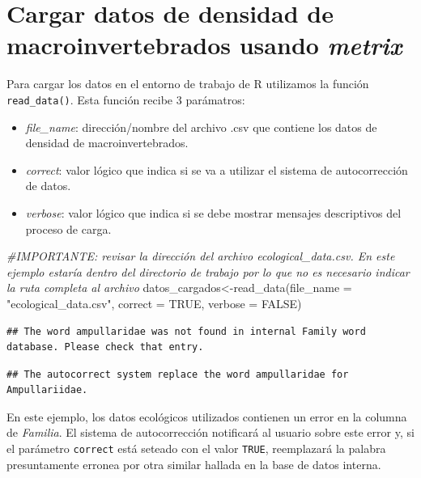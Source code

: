 \documentclass[
]{book}
\newenvironment{Shaded}{\begin{snugshade}}{\end{snugshade}}
\newcommand{\AttributeTok}[1]{\textcolor[rgb]{0.77,0.63,0.00}{#1}}
\newcommand{\CommentTok}[1]{\textcolor[rgb]{0.56,0.35,0.01}{\textit{#1}}}
\newcommand{\ConstantTok}[1]{\textcolor[rgb]{0.00,0.00,0.00}{#1}}
\newcommand{\FunctionTok}[1]{\textcolor[rgb]{0.00,0.00,0.00}{#1}}
\newcommand{\NormalTok}[1]{#1}
\newcommand{\OtherTok}[1]{\textcolor[rgb]{0.56,0.35,0.01}{#1}}
\newcommand{\StringTok}[1]{\textcolor[rgb]{0.31,0.60,0.02}{#1}}
\begin{document}
\hypertarget{cargar-datos-de-densidad-de-macroinvertebrados-usando-metrix}{%
\section{\texorpdfstring{Cargar datos de densidad de macroinvertebrados usando \emph{metrix}}{Cargar datos de densidad de macroinvertebrados usando metrix}}\label{cargar-datos-de-densidad-de-macroinvertebrados-usando-metrix}}

Para cargar los datos en el entorno de trabajo de R utilizamos la función \texttt{read\_data()}.
Esta función recibe 3 parámatros:

\begin{itemize}
\item
  \emph{file\_name}: dirección/nombre del archivo .csv que contiene los datos de densidad de macroinvertebrados.
\item
  \emph{correct}: valor lógico que indica si se va a utilizar el sistema de autocorrección de datos.
\item
  \emph{verbose}: valor lógico que indica si se debe mostrar mensajes descriptivos del proceso de carga.
\end{itemize}

\begin{Shaded}
\begin{Highlighting}[]
\CommentTok{\#IMPORTANTE: revisar la dirección del archivo ecological\_data.csv. En este ejemplo estaría dentro del directorio de trabajo por lo que no es necesario indicar la ruta completa al archivo}
\NormalTok{datos\_cargados}\OtherTok{\textless{}{-}}\FunctionTok{read\_data}\NormalTok{(}\AttributeTok{file\_name =} \StringTok{"ecological\_data.csv"}\NormalTok{, }\AttributeTok{correct =} \ConstantTok{TRUE}\NormalTok{, }\AttributeTok{verbose =} \ConstantTok{FALSE}\NormalTok{)}
\end{Highlighting}
\end{Shaded}

\begin{verbatim}
## The word ampullaridae was not found in internal Family word database. Please check that entry.
\end{verbatim}

\begin{verbatim}
## The autocorrect system replace the word ampullaridae for Ampullariidae.
\end{verbatim}

En este ejemplo, los datos ecológicos utilizados contienen un error en la columna de \emph{Familia}.
El sistema de autocorrección notificará al usuario sobre este error y, si el parámetro \texttt{correct} está seteado con el valor \texttt{TRUE}, reemplazará la palabra presuntamente erronea por otra similar hallada en la base de datos interna.
\end{document}
